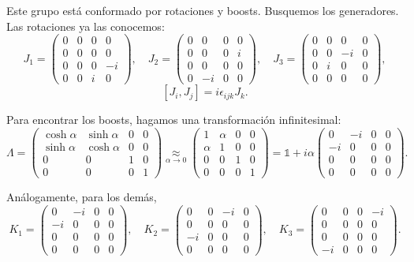 \documentclass[11pt,a4paper]{article}
\begin{document}
Este grupo está conformado por rotaciones y boosts. Busquemos los generadores. Las rotaciones ya las conocemos:
\[
  J_1=
  \begin{pmatrix}
    0&0&0&0\\
    0&0&0&0\\
    0&0&0&-i\\
    0&0&i&0
  \end{pmatrix},
  \quad
  J_2=
  \begin{pmatrix}
    0&0&0&0\\
    0&0&0&i\\
    0&0&0&0\\
    0&-i&0&0
  \end{pmatrix},
  \quad
  J_3=
  \begin{pmatrix}
    0&0&0&0\\
    0&0&-i&0\\
    0&i&0&0\\
    0&0&0&0
  \end{pmatrix},
\]
\[
  [J_i,J_j]=i\epsilon_{ijk}J_k.
\]

Para encontrar los boosts, hagamos una transformación infinitesimal:
\[
  \Lambda=
  \begin{pmatrix}
    \cosh\alpha&\sinh\alpha&0&0\\
    \sinh\alpha&\cosh\alpha&0&0\\
    0&0&1&0\\
    0&0&0&1
  \end{pmatrix}
  \underset{\alpha\to0}{\approx}
  \begin{pmatrix}
    1&\alpha&0&0\\
    \alpha&1&0&0\\
    0&0&1&0\\
    0&0&0&1
  \end{pmatrix}
  =\mathbb 1+i\alpha
  \begin{pmatrix}
    0&-i&0&0\\
    -i&0&0&0\\
    0&0&0&0\\
    0&0&0&0
  \end{pmatrix}.
\]

Análogamente, para los demás,
\[
  K_1=
  \begin{pmatrix}
    0&-i&0&0\\
    -i&0&0&0\\
    0&0&0&0\\
    0&0&0&0
  \end{pmatrix},
  \quad
  K_2=
  \begin{pmatrix}
    0&0&-i&0\\
    0&0&0&0\\
    -i&0&0&0\\
    0&0&0&0
  \end{pmatrix},
  \quad
  K_3=
  \begin{pmatrix}
    0&0&0&-i\\
    0&0&0&0\\
    0&0&0&0\\
    -i&0&0&0
  \end{pmatrix}.
\]
\end{document}
